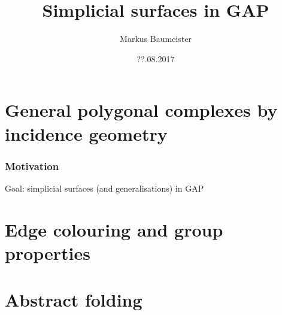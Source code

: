\documentclass[11pt]{beamer}
\author{Markus Baumeister}
\title{Simplicial surfaces in GAP}
\date{??.08.2017}
\theoremstyle{remark}
\begin{document}
\begin{frame}
\titlepage
\end{frame}


\begin{frame}
    \tableofcontents
\end{frame}

\section{General polygonal complexes by incidence geometry}
\begin{frame}
    \frametitle{Motivation}
    \pause
    Goal: simplicial surfaces (and generalisations) in GAP
    \pause
    \begin{center}
        
    \end{center}
\end{frame}

\section{Edge colouring and group properties}


\section{Abstract folding}
\end{document}
